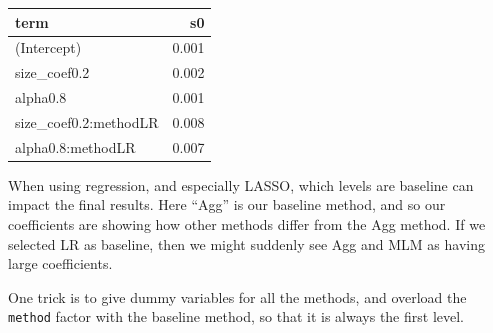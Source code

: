 \documentclass[
]{book}
\newenvironment{Shaded}{\begin{snugshade}}{\end{snugshade}}
\newcommand{\ControlFlowTok}[1]{\textcolor[rgb]{0.13,0.29,0.53}{\textbf{#1}}}
\newcommand{\DecValTok}[1]{\textcolor[rgb]{0.00,0.00,0.81}{#1}}
\newcommand{\FunctionTok}[1]{\textcolor[rgb]{0.13,0.29,0.53}{\textbf{#1}}}
\newcommand{\NormalTok}[1]{#1}
\newcommand{\OtherTok}[1]{\textcolor[rgb]{0.56,0.35,0.01}{#1}}
\newcommand{\SpecialCharTok}[1]{\textcolor[rgb]{0.81,0.36,0.00}{\textbf{#1}}}
\newcommand{\StringTok}[1]{\textcolor[rgb]{0.31,0.60,0.02}{#1}}
\begin{document}
\begin{tabular}{l|r}
\hline
term & s0\\
\hline
(Intercept) & 0.001\\
\hline
size\_coef0.2 & 0.002\\
\hline
alpha0.8 & 0.001\\
\hline
size\_coef0.2:methodLR & 0.008\\
\hline
alpha0.8:methodLR & 0.007\\
\hline
\end{tabular}

When using regression, and especially LASSO, which levels are baseline can impact the final results.
Here ``Agg'' is our baseline method, and so our coefficients are showing how other methods differ from the Agg method.
If we selected LR as baseline, then we might suddenly see Agg and MLM as having large coefficients.

One trick is to give dummy variables for all the methods, and overload the \texttt{method} factor with the baseline method, so that it is always the first level.

\begin{Shaded}
\end{Shaded}
\end{document}
